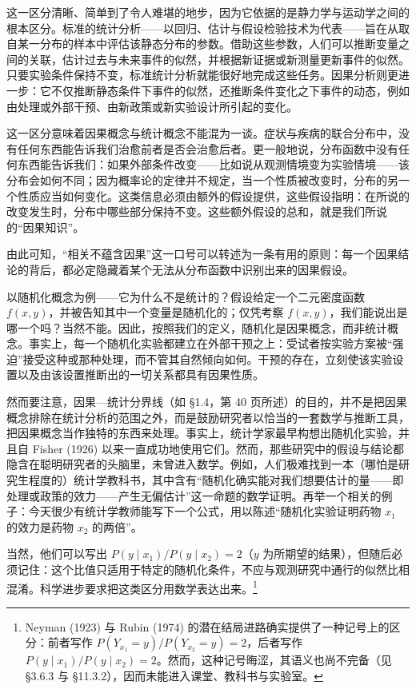 这一区分清晰、简单到了令人难堪的地步，因为它依据的是静力学与运动学之间的根本区分。标准的统计分析——以回归、估计与假设检验技术为代表——旨在从取自某一分布的样本中评估该静态分布的参数。借助这些参数，人们可以推断变量之间的关联，估计过去与未来事件的似然，并根据新证据或新测量更新事件的似然。只要实验条件保持不变，标准统计分析就能很好地完成这些任务。因果分析则更进一步：它不仅推断静态条件下事件的似然，还推断条件变化之下事件的动态，例如由处理或外部干预、由新政策或新实验设计所引起的变化。

这一区分意味着因果概念与统计概念不能混为一谈。症状与疾病的联合分布中，没有任何东西能告诉我们治愈前者是否会治愈后者。更一般地说，分布函数中没有任何东西能告诉我们：如果外部条件改变——比如说从观测情境变为实验情境——该分布会如何不同；因为概率论的定律并不规定，当一个性质被改变时，分布的另一个性质应当如何变化。这类信息必须由额外的假设提供，这些假设指明：在所说的改变发生时，分布中哪些部分保持不变。这些额外假设的总和，就是我们所说的“因果知识”。

由此可知，“相关不蕴含因果”这一口号可以转述为一条有用的原则：每一个因果结论的背后，都必定隐藏着某个无法从分布函数中识别出来的因果假设。

以随机化概念为例——它为什么不是统计的？假设给定一个二元密度函数 $f(x,y)$，并被告知其中一个变量是随机化的；仅凭考察 $f(x,y)$，我们能说出是哪一个吗？当然不能。因此，按照我们的定义，随机化是因果概念，而非统计概念。事实上，每一个随机化实验都建立在外部干预之上：受试者按实验方案被“强迫”接受这种或那种处理，而不管其自然倾向如何。干预的存在，立刻使该实验设置以及由该设置推断出的一切关系都具有因果性质。

然而要注意，因果—统计分界线（如 \S 1.4，第 40 页所述）的目的，并不是把因果概念排除在统计分析的范围之外，而是鼓励研究者以恰当的一套数学与推断工具，把因果概念当作独特的东西来处理。事实上，统计学家最早构想出随机化实验，并且自 Fisher (1926) 以来一直成功地使用它们。然而，那些研究中的假设与结论都隐含在聪明研究者的头脑里，未曾进入数学。例如，人们极难找到一本（哪怕是研究生程度的）统计学教科书，其中含有“随机化确实能对我们想要估计的量——即处理或政策的效力——产生无偏估计”这一命题的数学证明。再举一个相关的例子：今天很少有统计学教师能写下一个公式，用以陈述“随机化实验证明药物 $x_1$ 的效力是药物 $x_2$ 的两倍”。

当然，他们可以写出 $P(y\mid x_1)/P(y\mid x_2)=2$（$y$ 为所期望的结果），但随后必须记住：这个比值只适用于特定的随机化条件，不应与观测研究中通行的似然比相混淆。科学进步要求把这类区分用数学表达出来。\footnote{Neyman (1923) 与 Rubin (1974) 的潜在结局进路确实提供了一种记号上的区分：前者写作 $P(Y_{x_1}=y)/P(Y_{x_2}=y)=2$，后者写作 $P(y\mid x_1)/P(y\mid x_2)=2$。然而，这种记号晦涩，其语义也尚不完备（见 \S 3.6.3 与 \S 11.3.2），因而未能进入课堂、教科书与实验室。}

